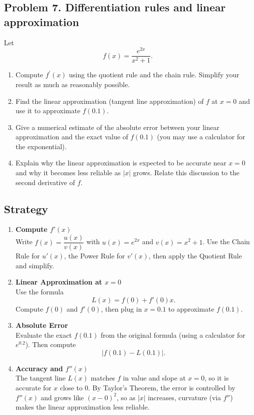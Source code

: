 \subsection{Problem 7. Differentiation rules and linear approximation}
Let
\[f(x)=\frac{e^{2x}}{x^{2}+1}.\]

\begin{enumerate}[label=(\alph*)]
    \item Compute $f^{\prime}(x)$ using the quotient rule and the chain rule. Simplify your result as much as reasonably possible.
    \item Find the linear approximation (tangent line approximation) of $f$ at $x=0$ and use it to approximate $f(0.1)$.
    \item Give a numerical estimate of the absolute error between your linear approximation and the exact value of $f(0.1)$ (you may use a calculator for the exponential).
    \item Explain why the linear approximation is expected to be accurate near $x=0$ and why it becomes less reliable as $|x|$ grows. Relate this discussion to the second derivative of $f$.
\end{enumerate}

\subsection*{Strategy}
\begin{enumerate}[label=(\alph*)]

    \item \textbf{Compute $f'(x)$} \\
    Write $f(x) = \dfrac{u(x)}{v(x)}$ with $u(x)=e^{2x}$ and $v(x)=x^2+1$.  
    Use the Chain Rule for $u'(x)$, the Power Rule for $v'(x)$, then apply the Quotient Rule and simplify.

    \item \textbf{Linear Approximation at $x=0$} \\
    Use the formula
    \[
        L(x) = f(0) + f'(0)x.
    \]
    Compute $f(0)$ and $f'(0)$, then plug in $x=0.1$ to approximate $f(0.1)$.

    \item \textbf{Absolute Error} \\
    Evaluate the exact $f(0.1)$ from the original formula (using a calculator for $e^{0.2}$).  
    Then compute
    \[
        \big| f(0.1) - L(0.1) \big|.
    \]

    \item \textbf{Accuracy and $f''(x)$} \\
    The tangent line $L(x)$ matches $f$ in value and slope at $x=0$, so it is accurate for $x$ close to $0$.  
    By Taylor’s Theorem, the error is controlled by $f''(x)$ and grows like $(x-0)^2$, so as $|x|$ increases, curvature (via $f''$) makes the linear approximation less reliable.
\end{enumerate}

